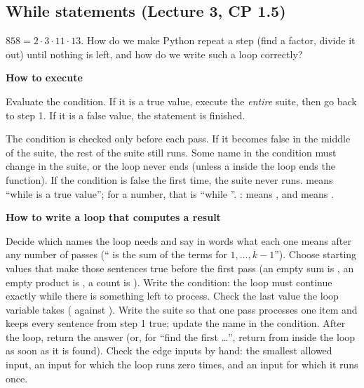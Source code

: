 \documentclass[10pt]{scrartcl}
\newenvironment{howto}[1]{\begin{mdframed}[style=howtostyle]{\color{NavyBlue}\textbf{#1}}\par\vspace{2pt}}{\end{mdframed}}
\begin{document}
\subsection{While statements (Lecture 3, CP 1.5)}
\begin{qbox}
  $858 = 2\cdot 3\cdot 11\cdot 13$. How do we make Python repeat a step (find a factor, divide it out) until nothing is left, and how do we write such a loop correctly?
\end{qbox}
\begin{howto}{How to execute }
\begin{steps}
  \ii Evaluate the condition.
  \ii If it is a true value, execute the \emph{entire} suite, then go back to step 1.
  \ii If it is a false value, the statement is finished.
\end{steps}
\end{howto}
\begin{itemize}
  \ii The condition is checked only before each pass. If it becomes false in the middle of the suite, the rest of the suite still runs.
  \ii Some name in the condition must change in the suite, or the loop never ends (unless a  inside the loop ends the function).
  \ii If the condition is false the first time, the suite never runs.
  \ii {} means ``while  is a true value''; for a number, that is ``while ''.
  \ii {}:  means , and  means .
\end{itemize}

\begin{howto}{How to write a loop that computes a result}
\begin{steps}
  \ii Decide which names the loop needs and say in words what each one means after any number of passes (`` is the sum of the terms for $1,\dots,k-1$'').
  \ii Choose starting values that make those sentences true before the first pass (an empty sum is , an empty product is , a count is ).
  \ii Write the condition: the loop must continue exactly while there is something left to process. Check the last value the loop variable takes (\cd{<} against \cd{<=}).
  \ii Write the suite so that one pass processes one item and keeps every sentence from step 1 true; update the name in the condition.
  \ii After the loop, return the answer (or, for ``find the first \dots'', return from inside the loop as soon as it is found).
  \ii Check the edge inputs by hand: the smallest allowed input, an input for which the loop runs zero times, and an input for which it runs once.
\end{steps}
\end{howto}
\end{document}
